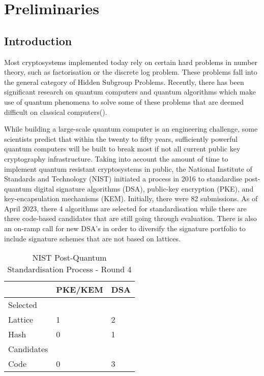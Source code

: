 \chapter{Preliminaries}


\section{Introduction}
Most cryptosystems implemented today rely on certain hard problems in number theory, such as factorisation or the discrete log problem. These problems fall into the general category of Hidden Subgroup Problems. Recently, there has been significant research on quantum computers and quantum algorithms which make use of quantum phenomena to solve some of these problems that are deemed difficult on classical computers(\cite{Shor,Jozsa}). 

While building a large-scale quantum computer is an engineering challenge, some scientists predict that within the twenty to fifty years, sufficiently powerful quantum computers will be built to break most if not all current public key cryptography infrastructure. Taking into account the amount of time to implement quantum resistant cryptosystems in public, the National Institute of Standards and Technology (NIST) initiated a process in 2016 to standardise post-quantum digital signature algorithms (DSA), public-key encryption (PKE), and key-encapsulation mechanisms (KEM). Initially, there were 82 submissions. As of April 2023, there 4 algorithms are selected for standardisation while there are three code-based candidates that are still going through evaluation. There is also an on-ramp call for new DSA's in order to diversify the signature portfolio to include signature schemes that are not based on lattices.

\begin{table}[]
\centering
\begin{tabular}{lll}
\hline
 & PKE/KEM & DSA \\ \hline
Selected &  &  \\ \hline
Lattice & 1 & 2 \\
Hash & 0 & 1 \\ \hline
Candidates &  &  \\ \hline
Code & 0 & 3 \\ \hline
\end{tabular}
\caption{NIST Post-Quantum Standardisation Process - Round 4}
\end{table}

